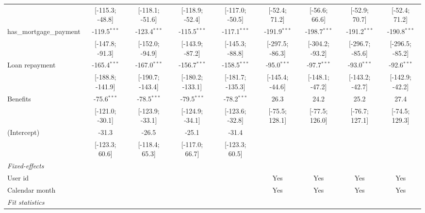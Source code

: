 \begin{table}[htbp]
\begin{threeparttable}[b]
\begin{tabular}{lcccccccc}
                                  & [-115.3; -48.8]  & [-118.1; -51.6]  & [-118.9; -52.4]  & [-117.0; -50.5]  & [-52.4; 71.2]    & [-56.6; 66.6]    & [-52.9; 70.7]    & [-52.4; 71.2]\\   
         has\_mortgage\_payment   & -119.5$^{***}$   & -123.4$^{***}$   & -115.5$^{***}$   & -117.1$^{***}$   & -191.9$^{***}$   & -198.7$^{***}$   & -191.2$^{***}$   & -190.8$^{***}$\\   
                                  & [-147.8; -91.3]  & [-152.0; -94.9]  & [-143.9; -87.2]  & [-145.3; -88.8]  & [-297.5; -86.3]  & [-304.2; -93.2]  & [-296.7; -85.6]  & [-296.5; -85.2]\\   
         Loan repayment           & -165.4$^{***}$   & -167.0$^{***}$   & -156.7$^{***}$   & -158.5$^{***}$   & -95.0$^{***}$    & -97.7$^{***}$    & -93.0$^{***}$    & -92.6$^{***}$\\   
                                  & [-188.8; -141.9] & [-190.7; -143.4] & [-180.2; -133.1] & [-181.7; -135.3] & [-145.4; -44.6]  & [-148.1; -47.2]  & [-143.2; -42.7]  & [-142.9; -42.2]\\   
         Benefits                 & -75.6$^{***}$    & -78.5$^{***}$    & -79.5$^{***}$    & -78.2$^{***}$    & 26.3             & 24.2             & 25.2             & 27.4\\   
                                  & [-121.0; -30.1]  & [-123.9; -33.1]  & [-124.9; -34.1]  & [-123.6; -32.8]  & [-75.5; 128.1]   & [-77.5; 126.0]   & [-76.7; 127.1]   & [-74.5; 129.3]\\   
         (Intercept)              & -31.3            & -26.5            & -25.1            & -31.4            &                  &                  &                  &   \\   
                                  & [-123.3; 60.6]   & [-118.4; 65.3]   & [-117.0; 66.7]   & [-123.3; 60.5]   &                  &                  &                  &   \\   
         \midrule
         \emph{Fixed-effects}\\
         User id                  &                  &                  &                  &                  & Yes              & Yes              & Yes              & Yes\\  
         Calendar month           &                  &                  &                  &                  & Yes              & Yes              & Yes              & Yes\\  
         \midrule
         \emph{Fit statistics}\\

\end{tabular}
\end{threeparttable}
\end{table}

